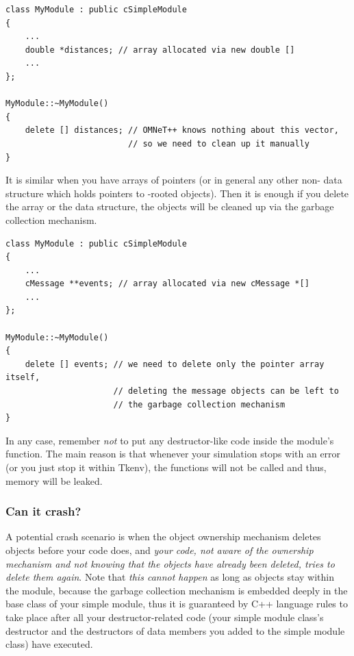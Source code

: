 \begin{verbatim}
class MyModule : public cSimpleModule
{
    ...
    double *distances; // array allocated via new double []
    ...
};

MyModule::~MyModule()
{
    delete [] distances; // OMNeT++ knows nothing about this vector,
                         // so we need to clean up it manually
}
\end{verbatim}

It is similar when you have arrays of  pointers
(or in general any other non-{\opp} data structure which holds pointers to
-rooted objects). Then it is enough if you delete
the array or the data structure, the objects will be cleaned up
via the garbage collection mechanism.

\begin{verbatim}
class MyModule : public cSimpleModule
{
    ...
    cMessage **events; // array allocated via new cMessage *[]
    ...
};

MyModule::~MyModule()
{
    delete [] events; // we need to delete only the pointer array itself,
                      // deleting the message objects can be left to
                      // the garbage collection mechanism
}
\end{verbatim}

In any case, remember \textit{not} to put any destructor-like
code inside the module's  function. The main reason
is that whenever your simulation stops with an error (or
you just stop it within Tkenv), the  functions
will not be called and thus, memory will be leaked.

\subsubsection{Can it crash?}

A potential crash scenario is when the object ownership
mechanism deletes objects before your code does, and \textit{your code,
not aware of the ownership mechanism and not knowing that the objects
have already been deleted, tries to delete them again}.
Note that \textit{this cannot happen} as long as objects stay within the module,
because the garbage collection mechanism is embedded deeply
in the base class of your simple module, thus it is guaranteed
by C++ language rules to take place after
all your destructor-related code (your simple module class's destructor
and the destructors of data members you added to the simple module class)
have executed.


